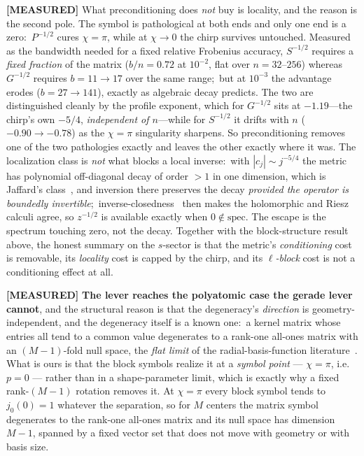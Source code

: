 \documentclass[aps,pra,twocolumn,superscriptaddress,longbibliography]{revtex4-2}
\begin{document}
\textbf{[MEASURED]} What preconditioning does \emph{not} buy is locality, and
the reason is the second pole.  The symbol is pathological at both ends and
only one end is a zero:\ $P^{-1/2}$ cures $\chi=\pi$, while at $\chi\to0$ the
chirp survives untouched.  Measured as the bandwidth needed for a fixed
relative Frobenius accuracy, $S^{-1/2}$ requires a \emph{fixed fraction} of the
matrix ($b/n=0.72$ at $10^{-2}$, flat over $n=32$--$256$) whereas $G^{-1/2}$
requires $b=11\to17$ over the same range;\ but at $10^{-3}$ the advantage
erodes ($b=27\to141$), exactly as algebraic decay predicts.  The two are
distinguished cleanly by the profile exponent, which for $G^{-1/2}$ sits at
$-1.19$---the chirp's own $-5/4$, \emph{independent of $n$}---while for
$S^{-1/2}$ it drifts with $n$ ($-0.90\to-0.78$) as the $\chi=\pi$ singularity
sharpens.  So preconditioning removes one of the two pathologies exactly and
leaves the other exactly where it was.  The localization class is
\emph{not} what blocks a local inverse:\ with $|c_j|\sim j^{-5/4}$ the metric
has polynomial off-diagonal decay of order $>1$ in one dimension, which is
Jaffard's class~\cite{jaffard1990}, and inversion there preserves the decay \emph{provided the
operator is boundedly invertible};\ inverse-closedness~\cite{grochenig_leinert2006}
then makes the
holomorphic and Riesz calculi agree, so $z^{-1/2}$ is available exactly when
$0\notin\mathrm{spec}$.  The escape is the spectrum touching zero, not the
decay.  Together with the block-structure
result above, the honest summary on the $s$-sector is that the metric's \emph{conditioning} cost
is removable, its \emph{locality} cost is capped by the chirp, and its
\emph{$\ell$-block} cost is not a conditioning effect at all.

\textbf{[MEASURED]} \textbf{The lever reaches the polyatomic case the gerade
lever cannot}, and the structural reason is that the degeneracy's \emph{direction}
is geometry-independent, and the degeneracy itself is a known one:\ a kernel
matrix whose entries all tend to a common value degenerates to a rank-one
all-ones matrix with an $(M-1)$-fold null space, the \emph{flat limit} of the
radial-basis-function literature~\cite{driscoll_fornberg2002,barthelme_usevich2021}.  What is ours is
that the block symbols realize it at a \emph{symbol point} --- $\chi=\pi$,
i.e.\ $p=0$ --- rather than in a shape-parameter limit, which is exactly why a
fixed rank-$(M-1)$ rotation removes it.  At $\chi=\pi$ every block symbol tends to $j_0(0)=1$
whatever the separation, so for $M$ centers the matrix symbol degenerates to the
rank-one all-ones matrix and its null space has dimension $M-1$, spanned by a
fixed vector set that does not move with geometry or with basis size.
\end{document}
